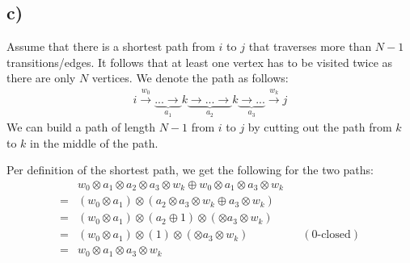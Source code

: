 \documentclass[a4paper,12pt]{ETHexercise}
\begin{document}
\subsection*{c)}
Assume that there is a shortest path from $i$ to $j$ that traverses more than $N-1$ transitions/edges.
It follows that at least one vertex has to be visited twice as there are only $N$ vertices.
We denote the path as follows:
\begin{align}
    i \stackrel{w_0}{\rightarrow} \underbrace{... \rightarrow}_{a_1} k \underbrace{\rightarrow ... \rightarrow}_{a_2} k \underbrace{\rightarrow ...}_{a_3} \stackrel{w_k}{\rightarrow} j
\end{align}
We can build a path of length $N-1$ from $i$ to $j$ by cutting out the path from $k$ to $k$ in the middle of the path. 

Per definition of the shortest path, we get the following for the two paths:
\begin{align}
    &w_0 \otimes a_1 \otimes a_2 \otimes a_3 \otimes w_k \oplus w_0 \otimes a_1 \otimes a_3 \otimes w_k\\
    = &(w_0 \otimes a_1) \otimes (a_2 \otimes a_3 \otimes w_k \oplus a_3 \otimes w_k)\\
    = &(w_0 \otimes a_1) \otimes (a_2 \oplus 1) \otimes (\otimes a_3 \otimes w_k)\\
    = &(w_0 \otimes a_1) \otimes (1) \otimes (\otimes a_3 \otimes w_k) &&(\text{0-closed})\\
    = &w_0 \otimes a_1 \otimes a_3 \otimes w_k
\end{align}
\end{document}
